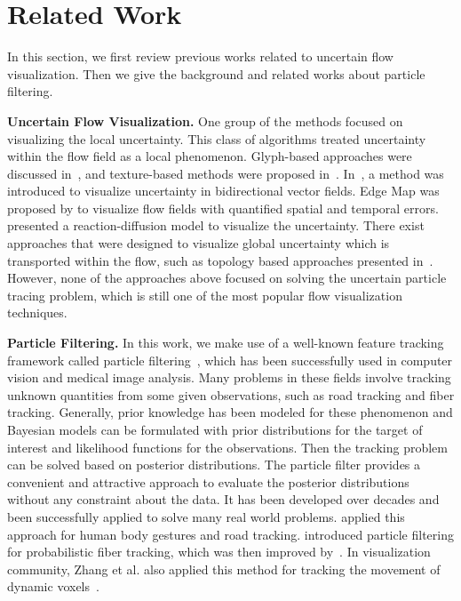 \section{Related Work}

In this section, we first review previous works related to uncertain flow visualization. Then we give the background and related works about particle filtering.

\textbf{Uncertain Flow Visualization.} One group of the methods focused on visualizing the local uncertainty. This class of algorithms treated uncertainty within the flow field as a local phenomenon. Glyph-based approaches were discussed in~\cite{citeulike:4002316, conf/visualization/LodhaPSW96}, and texture-based methods were proposed in~\cite{botchen:2006:IVUF, 10.1109/VIS.2005.97}. In~\cite{zuk:2008:UBVF}, a method was introduced to visualize uncertainty in bidirectional vector fields. Edge Map was proposed by \cite{10.1109/TVCG.2011.265} to visualize flow fields with quantified spatial and temporal errors. \cite{conf/visualization/SandersonJK04} presented a reaction-diffusion model to visualize the uncertainty. There exist approaches that were designed to visualize global uncertainty which is transported within the flow, such as topology based approaches presented in~\cite{Otto10a, Otto11a}. However, none of the approaches above focused on solving the uncertain particle tracing problem, which is still one of the most popular flow visualization techniques.

\textbf{Particle Filtering.} In this work, we make use of a well-known feature tracking framework called particle filtering~\cite{doucet2001sequential}, which has been successfully used in computer vision and medical image analysis. Many problems in these fields involve tracking unknown quantities from some given observations, such as road tracking and fiber tracking. Generally, prior knowledge has been modeled for these phenomenon and Bayesian models can be formulated with prior distributions for the target of interest and likelihood functions for the observations. Then the tracking problem can be solved based on posterior distributions. The particle filter provides a convenient and attractive approach to evaluate the posterior distributions without any constraint about the data. It has been developed over decades and been successfully applied to solve many real world problems. \cite{bb69534, journals/pami/GemanJ96} applied this approach for human body gestures and road tracking. \cite{Brun02whitematter, bjornemoMICCAI02} introduced particle filtering for probabilistic fiber tracking, which was then improved by~\cite{journals/mia/PontabryROSKD13, Zhang20095}. In visualization community, Zhang et al. also applied this method for tracking the movement of dynamic voxels~\cite{Zhao2012}.
